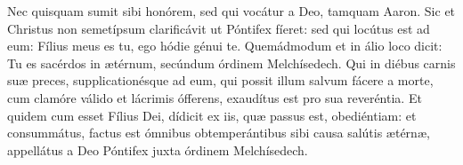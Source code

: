 Nec quisquam sumit sibi honórem, sed qui vocátur a Deo, tamquam Aaron.
Sic et Christus non semetípsum clarificávit ut Póntifex fíeret:
	sed qui locútus est ad eum: Fílius meus es tu, ego hódie génui te.
Quemádmodum et in álio loco dicit:
	Tu es sacérdos in ætérnum, secúndum órdinem Melchísedech.
Qui in diébus carnis suæ preces, supplicationésque ad eum,
	qui possit illum salvum fácere a morte, cum clamóre válido et lácrimis ófferens,
	exaudítus est pro sua reveréntia.
Et quidem cum esset Fílius Dei, dídicit ex iis, quæ passus est, obediéntiam:
	et consummátus, factus est ómnibus obtemperántibus sibi causa salútis ætérnæ,
	appellátus a Deo Póntifex juxta órdinem Melchísedech.
